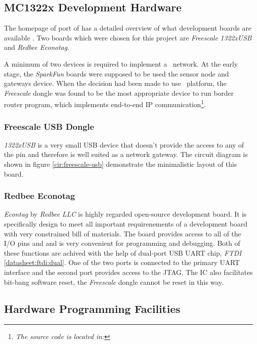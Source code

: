 \subsection{MC1322x Development Hardware}

  The homepage of  port of \contiki has a detailed
 overview of what development boards are available \cite{homepage:mc1322x:hw}.
 Two boards which were chosen for this project are \emph{Freescale
 1322xUSB} and \emph{Redbee Econotag}.

  A minimum of two devices is required to implement a \WPAN\ network.
 At the early stage, the \emph{SparkFun} boards were supposed to be
 used the sensor node and gateways device. When the decision had been
 made to use \MCX\ platform, the \emph{Freescale} dongle was found to
 be the most appropriate device to run \Contiki border router program,
 which implements end-to-end IP communication\footnote{\emph{The source
 code is located in: }}.

\subsubsection{Freescale USB Dongle}

 \emph{1322xUSB} is a very small USB device that doesn't provide the
 access to any of the pin and therefore is well suited as a network
 gateway. The circuit diagram is shown in figure \ref{cir:freescale-usb}
 demonstrate the minimalistic layout of this board.

\subsubsection{Redbee Econotag}

 \emph{Econtag} by \emph{Redbee LLC} is highly regarded open-source
 development board. It is specifically design to meet all important
 requirenements of a development board with very constrained bill of
 materials. The board provides access to all of the I/O pins and
 and is very convenient for programming and debugging. Both of these
 functions are achived with the help of dual-port USB UART chip,
 \emph{FTDI}  \ref{datasheet:ftdi:dual}. One of the two
 ports is connected to the primary UART interface and the second port
 provides access to the JTAG. The  IC also facilitates
 bit-bang software reset, the \emph{Freescale} dongle cannot be reset
 in this way.

\subsection{Hardware Programming Facilities}

